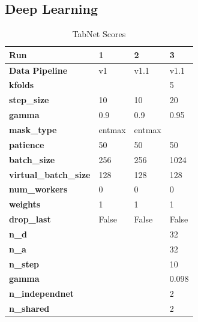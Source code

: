 \documentclass[sigconf, nonacm]{acmart}
\begin{document}
\subsection{Deep Learning}

\begin{table}[h]
	\caption{TabNet Scores}
	\label{tab:tabnet}
	\begin{tabular}{@{}|l|l|l|l|@{}}
		\toprule
		\textbf{Run}                  & \textbf{1} & \textbf{2} & \textbf{3} \\ \midrule
		\textbf{Data Pipeline}        & v1         & v1.1       & v1.1       \\ \midrule
		\textbf{kfolds}               &            &            & 5          \\ \midrule
		\textbf{step\_size}           & 10         & 10         & 20         \\ \midrule
		\textbf{gamma}                & 0.9        & 0.9        & 0.95       \\ \midrule
		\textbf{mask\_type}           & entmax     & entmax     &            \\ \midrule
		\textbf{patience}             & 50         & 50         & 50         \\ \midrule
		\textbf{batch\_size}          & 256        & 256        & 1024       \\ \midrule
		\textbf{virtual\_batch\_size} & 128        & 128        & 128        \\ \midrule
		\textbf{num\_workers}         & 0          & 0          & 0          \\ \midrule
		\textbf{weights}              & 1          & 1          & 1          \\ \midrule
		\textbf{drop\_last}           & False      & False      & False      \\ \midrule
		\textbf{n\_d}                 &            &            & 32         \\ \midrule
		\textbf{n\_a}                 &            &            & 32         \\ \midrule
		\textbf{n\_step}              &            &            & 10         \\ \midrule
		\textbf{gamma}                &            &            & 0.098      \\ \midrule
		\textbf{n\_independnet}       &            &            & 2          \\ \midrule
		\textbf{n\_shared}            &            &            & 2          \\ \midrule

\end{tabular}
\end{table}
\end{document}
